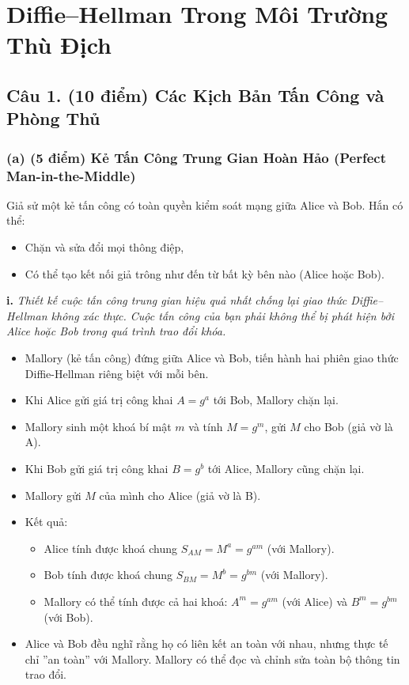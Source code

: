 \section{Diffie–Hellman Trong Môi Trường Thù Địch}

\subsection{Câu 1. (10 điểm) Các Kịch Bản Tấn Công và Phòng Thủ}

\subsubsection{(a) (5 điểm) Kẻ Tấn Công Trung Gian Hoàn Hảo (Perfect Man-in-the-Middle)}

Giả sử một kẻ tấn công có toàn quyền kiểm soát mạng giữa Alice và Bob. Hắn có thể:
\begin{itemize}
    \item Chặn và sửa đổi mọi thông điệp,
    \item Có thể tạo kết nối giả trông như đến từ bất kỳ bên nào (Alice hoặc Bob).
\end{itemize}

\textbf{i.} \textit{Thiết kế cuộc tấn công trung gian hiệu quả nhất chống lại giao thức Diffie–Hellman không xác thực. Cuộc tấn công của bạn phải không thể bị phát hiện bởi Alice hoặc Bob trong quá trình trao đổi khóa.}

\begin{itemize}
    \item Mallory (kẻ tấn công) đứng giữa Alice và Bob, tiến hành hai phiên giao thức Diffie-Hellman riêng biệt với mỗi bên.
    \item Khi Alice gửi giá trị công khai $A = g^a$ tới Bob, Mallory chặn lại.
    \item Mallory sinh một khoá bí mật $m$ và tính $M = g^m$, gửi $M$ cho Bob (giả vờ là A).
    \item Khi Bob gửi giá trị công khai $B = g^b$ tới Alice, Mallory cũng chặn lại.
    \item Mallory gửi $M$ của mình cho Alice (giả vờ là B).
    \item Kết quả: 
    \begin{itemize}
        \item Alice tính được khoá chung $S_{AM} = M^a = g^{am}$ (với Mallory).
        \item Bob tính được khoá chung $S_{BM} = M^b = g^{bm}$ (với Mallory).
        \item Mallory có thể tính được cả hai khoá: $A^m = g^{am}$ (với Alice) và $B^m = g^{bm}$ (với Bob).
    \end{itemize}
    \item Alice và Bob đều nghĩ rằng họ có liên kết an toàn với nhau, nhưng thực tế chỉ ''an toàn'' với Mallory. Mallory có thể đọc và chỉnh sửa toàn bộ thông tin trao đổi.
\end{itemize}

